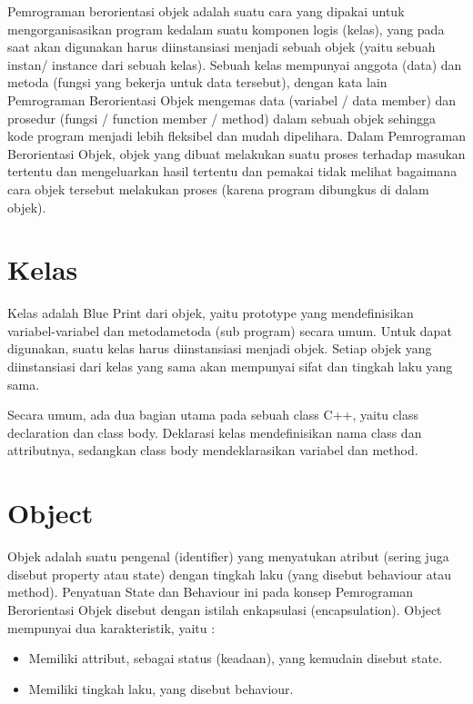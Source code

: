 Pemrograman berorientasi objek adalah suatu cara yang dipakai untuk
mengorganisasikan program kedalam suatu komponen logis (kelas), yang
pada saat akan digunakan harus diinstansiasi menjadi sebuah objek (yaitu
sebuah instan/ instance dari sebuah kelas). Sebuah kelas mempunyai
anggota (data) dan metoda (fungsi yang bekerja untuk data tersebut),
dengan kata lain Pemrograman Berorientasi Objek mengemas data (variabel
/ data member) dan prosedur (fungsi / function member / method) dalam
sebuah objek sehingga kode program menjadi lebih fleksibel dan mudah
dipelihara. Dalam Pemrograman Berorientasi Objek, objek yang dibuat
melakukan suatu proses terhadap masukan tertentu dan mengeluarkan hasil
tertentu dan pemakai tidak melihat bagaimana cara objek tersebut
melakukan proses (karena program dibungkus di dalam objek).

\section{Kelas}\label{kelas}

Kelas adalah Blue Print dari objek, yaitu prototype yang mendefinisikan
variabel-variabel dan metodametoda (sub program) secara umum. Untuk
dapat digunakan, suatu kelas harus diinstansiasi menjadi objek. Setiap
objek yang diinstansiasi dari kelas yang sama akan mempunyai sifat dan
tingkah laku yang sama.

Secara umum, ada dua bagian utama pada sebuah class C++, yaitu class
declaration dan class body. Deklarasi kelas mendefinisikan nama class
dan attributnya, sedangkan class body mendeklarasikan variabel dan
method.

\section{Object}\label{object}

Objek adalah suatu pengenal (identifier) yang menyatukan atribut (sering
juga disebut property atau state) dengan tingkah laku (yang disebut
behaviour atau method). Penyatuan State dan Behaviour ini pada konsep
Pemrograman Berorientasi Objek disebut dengan istilah enkapsulasi
(encapsulation). Object mempunyai dua karakteristik, yaitu :

\begin{itemize}
\tightlist
\item
  Memiliki attribut, sebagai status (keadaan), yang kemudain disebut
  state.
\item
  Memiliki tingkah laku, yang disebut behaviour.
\end{itemize}


